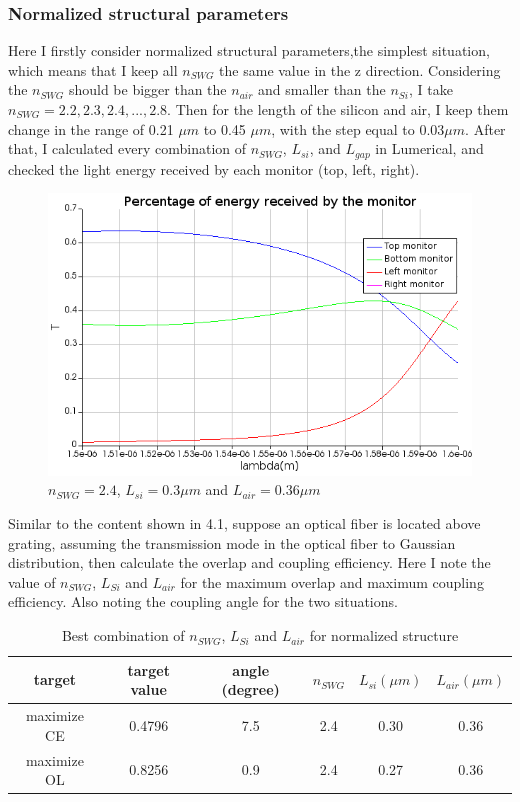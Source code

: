 \documentclass[]{article}
\begin{document}
\subsubsection{Normalized structural parameters}

Here I firstly consider normalized structural parameters,the simplest situation, which means that I keep all $n_{SWG}$ the same value in the z direction. Considering the $n_{SWG}$ should be bigger than the $n_{air}$ and smaller than the $n_{Si}$, I take $n_{SWG} = 2.2, 2.3, 2.4,..., 2.8$. Then for the length of the silicon and air, I keep them change in the range of 0.21 $\mu m$ to 0.45 $\mu m$, with the step equal to $0.03 \mu m$. After that, I calculated every combination of $n_{SWG}$, $L_{si}$, and $L_{gap}$ in Lumerical, and checked the light energy received by each monitor (top, left, right). 


\begin{figure}[H]
	\centering
	\includegraphics[width=0.7\linewidth]{figures/figure15.png}
	\caption{ $n_{SWG} = 2.4$, $L_{si} = 0.3 \mu m$ and $L_{air} = 0.36 \mu m$}
	\label{fig:figure11}
\end{figure}

Similar to the content shown in 4.1, suppose an optical fiber is located above grating, assuming the transmission mode in the optical fiber to Gaussian distribution, then calculate the overlap and coupling efficiency. Here I note the value of $n_{SWG}$, $L_{Si}$ and $L_{air}$ for the maximum overlap and maximum coupling efficiency. Also noting the coupling angle for the two situations.

\begin{table}[htbp]
	\centering
	\caption{Best  combination of $n_{SWG}$, $L_{Si}$ and $L_{air}$ for normalized structure}
	\begin{tabular}{cccccc}
		\hline
		target & target value & angle (degree) & $n_{SWG}$ & $L_{si} (\mu m)$ & $L_{air} (\mu m)$ \\ \hline
		maximize CE & 0.4796 & 7.5 & 2.4 & 0.30 & 0.36 \\
		maximize OL & 0.8256 & 0.9 & 2.4 & 0.27 & 0.36 \\ \hline
	\end{tabular}
\end{table}
\end{document}
